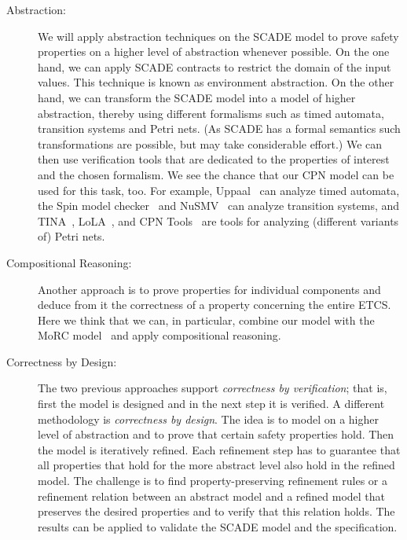 \begin{description}
	\item[Abstraction:] We will apply abstraction techniques on the SCADE model to prove safety properties on a higher level of abstraction whenever possible. On the one hand, we can apply SCADE contracts to restrict the domain of the input values. This technique is known as environment abstraction. On the other hand, we can transform the SCADE model into a model of higher abstraction, thereby using different formalisms such as timed automata, transition systems and Petri nets. (As SCADE has a formal semantics such transformations are possible, but may take considerable effort.) We can then use verification tools that are dedicated to the properties of interest and the chosen formalism. We see the chance that our CPN model can be used for this task, too. For example, Uppaal~\cite{BehrmannDLHPYH2006} can analyze timed automata, the Spin model checker~\cite{Holzmann97} and NuSMV~\cite{CimattiCGGPRST2002} can analyze transition systems, and TINA~\cite{BerthomieuV2006}, LoLA~\cite{Wolf2007}, and CPN Tools~\cite{Westergaard2013apn} are tools for analyzing (different variants of) Petri nets.
	\item[Compositional Reasoning:] Another approach is to prove properties for individual components and deduce from it the correctness of a property concerning the entire ETCS. Here we think that we can, in particular, combine our model with the MoRC model~\cite{braunstein_MorC_2013} and apply compositional reasoning.
	\item[Correctness by Design:] The two previous approaches support \textit{correctness by verification}; that is, first the model is designed and in the next step it is verified. A different methodology is \textit{correctness by design}. The idea is to model on a higher level of abstraction and to prove that certain safety properties hold. Then the model is iteratively refined. Each refinement step has to guarantee that all properties that hold for the more abstract level also hold in the refined model. The challenge is to find property-preserving refinement rules or a refinement relation between an abstract model and a refined model that preserves the desired properties and to verify that this relation holds. The results can be applied to validate the SCADE model and the specification.
\end{description}



